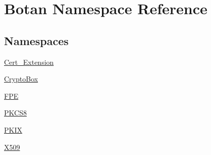 \hypertarget{namespace_botan}{}\section{Botan Namespace Reference}
\label{namespace_botan}
\subsection*{Namespaces}
\begin{DoxyCompactItemize}
\item 
 \hyperlink{namespace_botan_1_1_cert___extension}{Cert\+\_\+\+Extension}
\item 
 \hyperlink{namespace_botan_1_1_crypto_box}{Crypto\+Box}
\item 
 \hyperlink{namespace_botan_1_1_f_p_e}{F\+PE}
\item 
 \hyperlink{namespace_botan_1_1_p_k_c_s8}{P\+K\+C\+S8}
\item 
 \hyperlink{namespace_botan_1_1_p_k_i_x}{P\+K\+IX}
\item 
 \hyperlink{namespace_botan_1_1_x509}{X509}
\end{DoxyCompactItemize}
